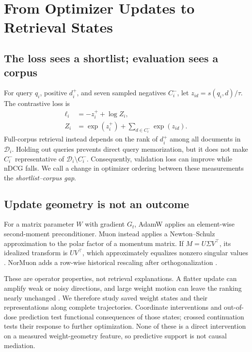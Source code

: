 \documentclass[11pt]{article}
\begin{document}
\section{From Optimizer Updates to Retrieval States}

\subsection{The loss sees a shortlist; evaluation sees a corpus}

For query $q_i$, positive $d_i^+$, and seven sampled negatives $C_i^-$, let
$z_{id}=s(q_i,d)/\tau$. The contrastive loss is
\begin{align}
\ell_i &= -z_i^+ + \log Z_i, \\
Z_i &= \exp(z_i^+) + \sum_{d\in C_i^-}\exp(z_{id}).
\end{align}
Full-corpus retrieval instead depends on the rank of $d_i^+$ among all documents in
$\mathcal D_i$. Holding out queries prevents direct query memorization, but it does not make
$C_i^-$ representative of $\mathcal D_i\setminus C_i^-$. Consequently, validation loss can improve
while nDCG falls. We call a change in optimizer ordering between these measurements the
\emph{shortlist--corpus gap}.

\subsection{Update geometry is not an outcome}

For a matrix parameter $W$ with gradient $G_t$, AdamW applies an element-wise second-moment
preconditioner. Muon instead applies a Newton--Schulz approximation to the polar factor of a momentum
matrix. If $M=U\Sigma V^\top$, its idealized transform is $UV^\top$, which approximately equalizes
nonzero singular values \citep{jordan2024muon}. NorMuon adds a row-wise historical rescaling after
orthogonalization \citep{li2025normuon}.

These are operator properties, not retrieval explanations. A flatter update can amplify weak or
noisy directions, and large weight motion can leave the ranking nearly unchanged
\citep{pang2026htmuon,qu2026finetune}. We therefore study saved weight states and their representations along complete trajectories.
Coordinate interventions and out-of-dose prediction test functional consequences of those states;
crossed continuation tests their response to further optimization. None of these is a direct
intervention on a measured weight-geometry feature, so predictive support is not causal mediation.
\end{document}
